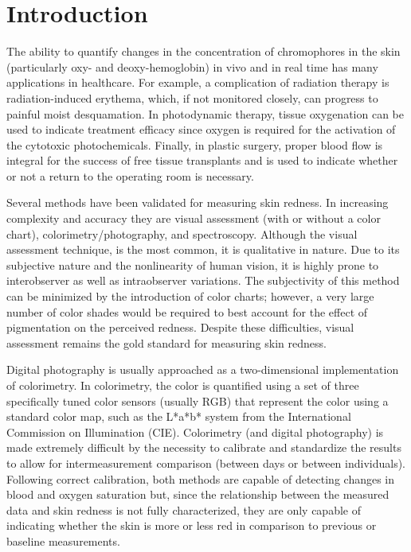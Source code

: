 \section{Introduction}
The ability to quantify changes in the concentration of chromophores in the skin (particularly oxy- and deoxy-hemoglobin) in vivo and in real time has many applications in healthcare. For example, a complication of radiation therapy is radiation-induced erythema, which, if not monitored closely, can progress to painful moist desquamation.\cite{Hopewell1990,Russell1994,Nystrom2004,Fitzgerald2008} In photodynamic therapy, tissue oxygenation can be used to indicate treatment efficacy\cite{Woodhams2007} since oxygen is required for the activation of the cytotoxic photochemicals.\cite{Patterson1989a,Wilson2008} Finally, in plastic surgery, proper blood flow is integral for the success of free tissue transplants and is used to indicate whether or not a return to the operating room is necessary.\cite{Steele2011}

Several methods have been validated for measuring skin redness. In increasing complexity and accuracy they are visual assessment (with or without a color chart), colorimetry/photography, and spectroscopy.\cite{Agache2004} Although the visual assessment technique,\cite{Trotti2003} is the most common, it is qualitative in nature. Due to its subjective nature and the nonlinearity of human vision, it is highly prone to interobserver as well as intraobserver variations.\cite{Bodekaer2013} The subjectivity of this method can be minimized by the introduction of color charts; however, a very large number of color shades would be required to best account for the effect of pigmentation on the perceived redness. Despite these difficulties, visual assessment remains the gold standard for measuring skin redness.\cite{Basketter1997,Wengstrom2004}

Digital photography is usually approached as a two-dimensional implementation of colorimetry. In colorimetry, the color is quantified using a set of three specifically tuned color sensors (usually RGB) that represent the color using a standard color map, such as the L*a*b* system from the International Commission on Illumination (CIE).\cite{CI2012} Colorimetry (and digital photography) is made extremely difficult by the necessity to calibrate and standardize the results to allow for intermeasurement comparison (between days or between individuals).\cite{Jung2012} Following correct calibration, both methods are capable of detecting changes in blood and oxygen saturation but, since the relationship between the measured data and skin redness is not fully characterized, they are only capable of indicating whether the skin is more or less red in comparison to previous or baseline measurements.\cite{Kollias2002,Canning2009,Nishidate2011,Setaro2002}

